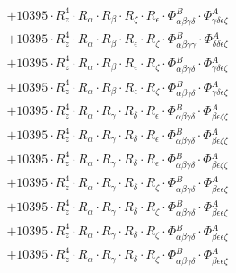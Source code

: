 \documentclass{article}
\begin{document}
\begin{subequations}
\begin{gather}
\begin{array}{c}
 \\[0.2em] 		 + 10395 \cdot R_{z}^{4} \cdot R_{\alpha{}} \cdot R_{\beta{}} \cdot R_{\zeta{}} \cdot R_{\epsilon{}} \cdot \Phi{}^{B}_{\alpha{}\beta{}\gamma{}\delta{}} \cdot \Phi{}^{A}_{\gamma{}\delta{}\epsilon{}\zeta{}} 
 \\[0.2em] 		 + 10395 \cdot R_{z}^{4} \cdot R_{\alpha{}} \cdot R_{\beta{}} \cdot R_{\epsilon{}} \cdot R_{\zeta{}} \cdot \Phi{}^{B}_{\alpha{}\beta{}\gamma{}\gamma{}} \cdot \Phi{}^{A}_{\delta{}\delta{}\epsilon{}\zeta{}} 
 \\[0.2em] 		 + 10395 \cdot R_{z}^{4} \cdot R_{\alpha{}} \cdot R_{\beta{}} \cdot R_{\epsilon{}} \cdot R_{\zeta{}} \cdot \Phi{}^{B}_{\alpha{}\beta{}\gamma{}\delta{}} \cdot \Phi{}^{A}_{\gamma{}\delta{}\epsilon{}\zeta{}} 
 \\[0.2em] 		 + 10395 \cdot R_{z}^{4} \cdot R_{\alpha{}} \cdot R_{\beta{}} \cdot R_{\epsilon{}} \cdot R_{\zeta{}} \cdot \Phi{}^{B}_{\alpha{}\beta{}\gamma{}\delta{}} \cdot \Phi{}^{A}_{\gamma{}\delta{}\epsilon{}\zeta{}} 
 \\[0.2em] 		 + 10395 \cdot R_{z}^{4} \cdot R_{\alpha{}} \cdot R_{\gamma{}} \cdot R_{\delta{}} \cdot R_{\epsilon{}} \cdot \Phi{}^{B}_{\alpha{}\beta{}\gamma{}\delta{}} \cdot \Phi{}^{A}_{\beta{}\epsilon{}\zeta{}\zeta{}} 
 \\[0.2em] 		 + 10395 \cdot R_{z}^{4} \cdot R_{\alpha{}} \cdot R_{\gamma{}} \cdot R_{\delta{}} \cdot R_{\epsilon{}} \cdot \Phi{}^{B}_{\alpha{}\beta{}\gamma{}\delta{}} \cdot \Phi{}^{A}_{\beta{}\epsilon{}\zeta{}\zeta{}} 
 \\[0.2em] 		 + 10395 \cdot R_{z}^{4} \cdot R_{\alpha{}} \cdot R_{\gamma{}} \cdot R_{\delta{}} \cdot R_{\epsilon{}} \cdot \Phi{}^{B}_{\alpha{}\beta{}\gamma{}\delta{}} \cdot \Phi{}^{A}_{\beta{}\epsilon{}\zeta{}\zeta{}} 
 \\[0.2em] 		 + 10395 \cdot R_{z}^{4} \cdot R_{\alpha{}} \cdot R_{\gamma{}} \cdot R_{\delta{}} \cdot R_{\zeta{}} \cdot \Phi{}^{B}_{\alpha{}\beta{}\gamma{}\delta{}} \cdot \Phi{}^{A}_{\beta{}\epsilon{}\epsilon{}\zeta{}} 
 \\[0.2em] 		 + 10395 \cdot R_{z}^{4} \cdot R_{\alpha{}} \cdot R_{\gamma{}} \cdot R_{\delta{}} \cdot R_{\zeta{}} \cdot \Phi{}^{B}_{\alpha{}\beta{}\gamma{}\delta{}} \cdot \Phi{}^{A}_{\beta{}\epsilon{}\epsilon{}\zeta{}} 
 \\[0.2em] 		 + 10395 \cdot R_{z}^{4} \cdot R_{\alpha{}} \cdot R_{\gamma{}} \cdot R_{\delta{}} \cdot R_{\zeta{}} \cdot \Phi{}^{B}_{\alpha{}\beta{}\gamma{}\delta{}} \cdot \Phi{}^{A}_{\beta{}\epsilon{}\epsilon{}\zeta{}} 
 \\[0.2em] 		 + 10395 \cdot R_{z}^{4} \cdot R_{\alpha{}} \cdot R_{\gamma{}} \cdot R_{\delta{}} \cdot R_{\zeta{}} \cdot \Phi{}^{B}_{\alpha{}\beta{}\gamma{}\delta{}} \cdot \Phi{}^{A}_{\beta{}\epsilon{}\epsilon{}\zeta{}} 

\end{array}
\end{gather}
\end{subequations}
\end{document}
